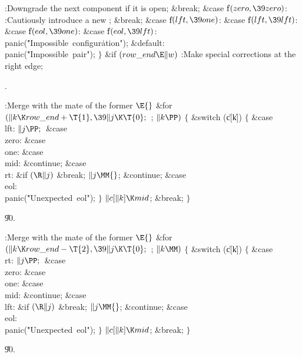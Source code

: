 :Downgrade the next component if it is open\X;\5
\&{break};\6
\4\&{case} \|f${}(\\{zero},\39\\{zero}){}$:\5
:Cautiously introduce a new \X;\5
\&{break};\6
\4\&{case} \|f${}(\\{lft},\39\\{one}){}$:\5
\&{case} \|f${}(\\{lft},\39\\{lft}){}$:\5
\&{case} \|f${}(\\{eol},\39\\{one}){}$:\5
\&{case} \|f${}(\\{eol},\39\\{lft}){}$:\5
\\{panic}(\.{"Impossible\ configur}\)\.{ation"});\6
\4\&{default}:\5
\\{panic}(\.{"Impossible\ pair"});\6
\4${}\}{}$\2\6
\&{if} ${}(\\{row\_end}\E\|w){}$\1\5
:Make special corrections at the right edge\X;\2\par
{}.\fi

\B{}:Merge with the mate of the former %
\X${}\E{}$\6
\&{for} ${}(\|k\K\\{row\_end}+\T{1},\39\|j\K\T{0};{}$  ; ${}\|k\PP){}$\5
${}\{{}$\1\6
\&{switch} (\|c[\|k])\5
${}\{{}$\1\6
\4\&{case} \\{lft}:\5
${}\|j\PP;{}$\6
\4\&{case} \\{zero}:\5
\&{case} \\{one}:\5
\&{case} \\{mid}:\5
\&{continue};\6
\4\&{case} \\{rt}:\5
\&{if} ${}(\R\|j){}$\1\5
\&{break};\2\6
${}\|j\MM{}$;\5
\&{continue};\6
\4\&{case} \\{eol}:\5
\\{panic}(\.{"Unexpected\ eol"});\6
\4${}\}{}$\2\6
${}\|c[\|k]\K\\{mid}{}$;\5
\&{break};\6
\4${}\}{}$\2\par
\U90.\fi

\B{}:Merge with the mate of the former \X${}%
\E{}$\6
\&{for} ${}(\|k\K\\{row\_end}-\T{2},\39\|j\K\T{0};{}$  ; ${}\|k\MM){}$\5
${}\{{}$\1\6
\&{switch} (\|c[\|k])\5
${}\{{}$\1\6
\4\&{case} \\{rt}:\5
${}\|j\PP;{}$\6
\4\&{case} \\{zero}:\5
\&{case} \\{one}:\5
\&{case} \\{mid}:\5
\&{continue};\6
\4\&{case} \\{lft}:\5
\&{if} ${}(\R\|j){}$\1\5
\&{break};\2\6
${}\|j\MM{}$;\5
\&{continue};\6
\4\&{case} \\{eol}:\5
\\{panic}(\.{"Unexpected\ eol"});\6
\4${}\}{}$\2\6
${}\|c[\|k]\K\\{mid}{}$;\5
\&{break};\6
\4${}\}{}$\2\par
\U90.\fi

